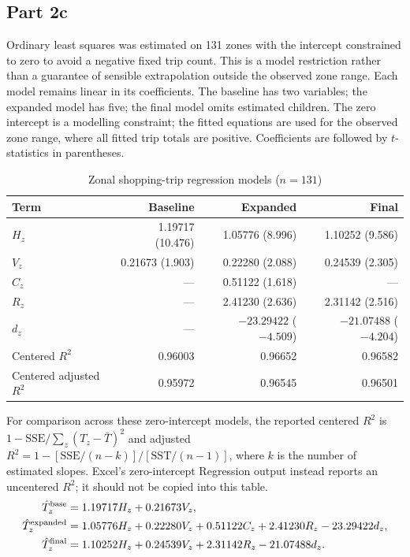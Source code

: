 \documentclass[11pt]{article}
\begin{document}
\subsection{Part 2c}
Ordinary least squares was estimated on 131 zones with the intercept constrained to zero to avoid a negative fixed trip count. This is a model restriction rather than a guarantee of sensible extrapolation outside the observed zone range. Each model remains linear in its coefficients. The baseline has two variables; the expanded model has five; the final model omits estimated children. The zero intercept is a modelling constraint; the fitted equations are used for the observed zone range, where all fitted trip totals are positive. Coefficients are followed by $t$-statistics in parentheses.
\begin{table}[H]\centering\small
\caption{Zonal shopping-trip regression models ($n=131$)}
\begin{tabular}{lrrr}\toprule
Term & Baseline & Expanded & Final\\\midrule
$H_z$ & 1.19717 (10.476) & 1.05776 (8.996) & 1.10252 (9.586)\\
$V_z$ & 0.21673 (1.903) & 0.22280 (2.088) & 0.24539 (2.305)\\
$C_z$ & --- & 0.51122 (1.618) & ---\\
$R_z$ & --- & 2.41230 (2.636) & 2.31142 (2.516)\\
$d_z$ & --- & $-23.29422$ ($-4.509$) & $-21.07488$ ($-4.204$)\\\midrule
Centered $R^2$ & 0.96003 & 0.96652 & 0.96582\\
Centered adjusted $R^2$ & 0.95972 & 0.96545 & 0.96501\\
\bottomrule\end{tabular}\end{table}
For comparison across these zero-intercept models, the reported centered $R^2$ is $1-\mathrm{SSE}/\sum_z(T_z-\bar T)^2$ and adjusted $R^2=1-[\mathrm{SSE}/(n-k)]/[\mathrm{SST}/(n-1)]$, where $k$ is the number of estimated slopes. Excel's zero-intercept Regression output instead reports an uncentered $R^2$; it should not be copied into this table.
\begin{align*}
\hat T_z^{\rm base}&=1.19717H_z+0.21673V_z,\\
\hat T_z^{\rm expanded}&=1.05776H_z+0.22280V_z+0.51122C_z+2.41230R_z-23.29422d_z,\\
\hat T_z^{\rm final}&=1.10252H_z+0.24539V_z+2.31142R_z-21.07488d_z.
\end{align*}
\end{document}
